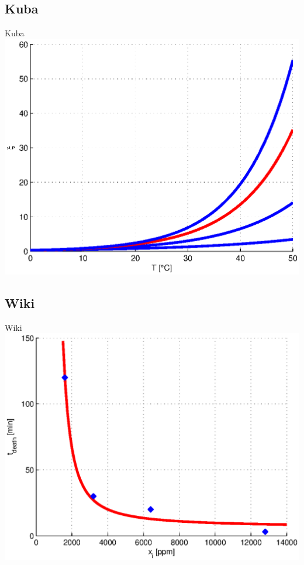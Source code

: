 \subsection{Kuba}
\begin{frame}{Kuba}
\includegraphics[width=\textwidth,height=0.8\textheight,keepaspectratio]{wykresy-kuba}
\end{frame}

\subsection{Wiki}
\begin{frame}{Wiki}
\includegraphics[width=\textwidth,height=0.8\textheight,keepaspectratio]{wykresy-wiki}
\end{frame}

